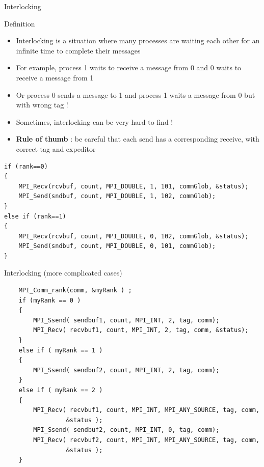 \documentclass[compress,10pt,aspectratio=169]{beamer}
\begin{document}
\begin{frame}[fragile]{Interlocking}
    \scriptsize
    \begin{block}{Definition}
        \begin{itemize}
            \item Interlocking is a situation where many processes are waiting each other for an infinite time to complete their messages
            \item For example, process 1 waits to receive a message from 0 and 0 waits to receive a message from 1
            \item Or process 0 sends a message to 1 and process 1 waits a message from 0 but with wrong tag !
            \item Sometimes, interlocking can be very hard to find !
            \item \textbf{Rule of thumb} : be careful that each send has a corresponding receive, with correct tag and expeditor
        \end{itemize}
    \end{block}

\begin{verbatim}
if (rank==0)
{
    MPI_Recv(rcvbuf, count, MPI_DOUBLE, 1, 101, commGlob, &status);
    MPI_Send(sndbuf, count, MPI_DOUBLE, 1, 102, commGlob);
}
else if (rank==1)
{
    MPI_Recv(rcvbuf, count, MPI_DOUBLE, 0, 102, commGlob, &status);
    MPI_Send(sndbuf, count, MPI_DOUBLE, 0, 101, commGlob);
}
\end{verbatim}
\end{frame}

\begin{frame}[fragile]{Interlocking (more complicated cases)}

    \begin{verbatim}
    MPI_Comm_rank(comm, &myRank ) ;
    if (myRank == 0 ) 
    {
        MPI_Ssend( sendbuf1, count, MPI_INT, 2, tag, comm);
        MPI_Recv( recvbuf1, count, MPI_INT, 2, tag, comm, &status);
    } 
    else if ( myRank == 1 ) 
    {
        MPI_Ssend( sendbuf2, count, MPI_INT, 2, tag, comm);
    }
    else if ( myRank == 2 ) 
    {
        MPI_Recv( recvbuf1, count, MPI_INT, MPI_ANY_SOURCE, tag, comm,
                 &status );
        MPI_Ssend( sendbuf2, count, MPI_INT, 0, tag, comm);
        MPI_Recv( recvbuf2, count, MPI_INT, MPI_ANY_SOURCE, tag, comm,
                 &status );
    }    
    \end{verbatim}
    \end{frame}
    
\end{document}
